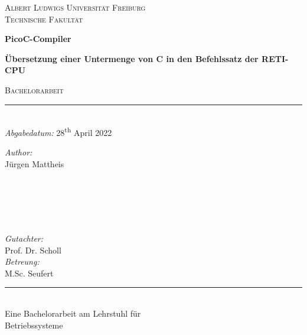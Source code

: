 
\begin{titlepage}
  \vspace{1cm}
  \center
  \textsc{\LARGE Albert Ludwigs Universität Freiburg}\\[0.5cm]
  \textsc{\Large Technische Fakultät}\\[2.0cm]

  \vspace{1cm}

  \begin{titlebox}{\center \huge \sffamily \bfseries PicoC-Compiler}
    \center
    {\bfseries \center \sffamily \LARGE {} Übersetzung einer Untermenge von C in den Befehlssatz der RETI-CPU\par}
  \end{titlebox}
    \textsc{\large Bachelorarbeit}\\
    \rule{\linewidth}{0.1mm}\\[0.5cm]

  {\large \emph{Abgabedatum:} 28\textsuperscript{th} April 2022}\\[2.5cm]

  \begin{minipage}{0.45\textwidth}
    \begin{flushleft} \large
      \emph{Author:}\\
      Jürgen Mattheis\\
      \hspace{1cm}\\
      \hspace{1cm}\\
      \hspace{1cm}\\
      \hspace{1cm}
    \end{flushleft}
  \end{minipage}
  ~
  \begin{minipage}{0.45\textwidth}
    \begin{flushright} \large
      \emph{Gutachter:}\\
      Prof. Dr. Scholl\\[0.64cm]
      \emph{Betreung:}\\
      M.Sc. Seufert\\
    \end{flushright}
  \end{minipage}

  \vspace{10.cm}
  \rule{11cm}{0.1mm}\\[0.25cm]
  \large{Eine Bachelorarbeit am Lehrstuhl für}\\
  \large{Betriebssysteme}
\end{titlepage}
